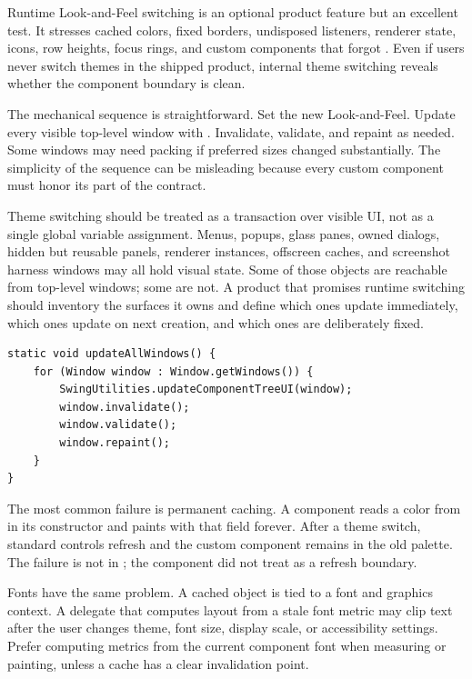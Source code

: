 Runtime Look-and-Feel switching is an optional product feature but an excellent test. It stresses cached colors, fixed borders, undisposed listeners, renderer state, icons, row heights, focus rings, and custom components that forgot . Even if users never switch themes in the shipped product, internal theme switching reveals whether the component boundary is clean.

The mechanical sequence is straightforward. Set the new Look-and-Feel. Update every visible top-level window with . Invalidate, validate, and repaint as needed. Some windows may need packing if preferred sizes changed substantially. The simplicity of the sequence can be misleading because every custom component must honor its part of the contract.

Theme switching should be treated as a transaction over visible UI, not as a single global variable assignment. Menus, popups, glass panes, owned dialogs, hidden but reusable panels, renderer instances, offscreen caches, and screenshot harness windows may all hold visual state. Some of those objects are reachable from top-level windows; some are not. A product that promises runtime switching should inventory the surfaces it owns and define which ones update immediately, which ones update on next creation, and which ones are deliberately fixed.

\begin{lstlisting}[caption={Updating visible windows after a Look-and-Feel change.}]
static void updateAllWindows() {
    for (Window window : Window.getWindows()) {
        SwingUtilities.updateComponentTreeUI(window);
        window.invalidate();
        window.validate();
        window.repaint();
    }
}
\end{lstlisting}

The most common failure is permanent caching. A component reads a color from  in its constructor and paints with that field forever. After a theme switch, standard controls refresh and the custom component remains in the old palette. The failure is not in ; the component did not treat  as a refresh boundary.

Fonts have the same problem. A cached  object is tied to a font and graphics context. A delegate that computes layout from a stale font metric may clip text after the user changes theme, font size, display scale, or accessibility settings. Prefer computing metrics from the current component font when measuring or painting, unless a cache has a clear invalidation point.


